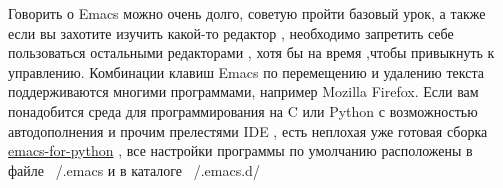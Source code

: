 Говорить о Emacs можно очень долго, советую пройти базовый урок, а также если вы захотите изучить какой-то редактор , необходимо запретить себе пользоваться остальными редакторами , хотя бы на время ,чтобы привыкнуть к управлению. Комбинации клавиш Emacs по перемещению и удалению текста поддерживаются многими программами, например Mozilla Firefox. Если вам понадобится среда для программирования на C  или Python с возможностью автодополнения и прочим прелестями IDE , есть неплохая уже готовая сборка \href{http://gabrielelanaro.github.com/emacs-for-python/}{emacs-for-python} , все настройки программы по умолчанию расположены в файле ~/.emacs и в каталоге ~/.emacs.d/